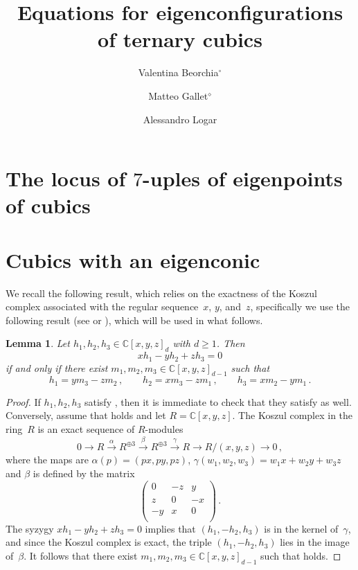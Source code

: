 \documentclass[a4paper, 11pt, reqno]{amsart}
\title{Equations for eigenconfigurations of ternary cubics}
\author[Valentina Beorchia]{Valentina Beorchia$^{\circ}$}
\author[Matteo Gallet]{Matteo Gallet$^{\diamond}$}
\author[Alessandro Logar]{Alessandro Logar}
\date{}
\theoremstyle{plain}
\newtheorem{lemma}{Lemma}[section]
\theoremstyle{definition}
\newcommand{\C}{\mathbb{C}}
\begin{document}
\maketitle


\section{The locus of $7$-uples of eigenpoints of cubics}

\section{Cubics with an eigenconic}




We recall the following result, which relies on the exactness of the Koszul complex associated with the regular sequence~$x$, $y$, and~$z$, specifically we use the following result (see \cite[Theorem~7.3.13]{Dolgachev} or \cite[Lemma~3.9]{BGV}), which will be used in what follows.

\begin{lemma}
\label{lem:Koszul}
Let $h_1,h_2,h_3\in\C[x,y,z]_d$ with $d \ge 1$. Then
%
\begin{equation}
\label{eq:linear_relazion}
  xh_1-yh_2+zh_3 = 0
\end{equation}
%
if and only if there exist $m_1,m_2,m_3\in\C[x,y,z]_{d-1}$ such that
%
\begin{equation}
\label{eq:minors_lemma}
  h_1 = ym_3-zm_2 \,, \qquad
  h_2 = xm_3-zm_1 \,, \qquad
  h_3 = xm_2-ym_1 \,.
\end{equation}
%
\end{lemma}

\begin{proof}
If $h_1,h_2,h_3$ satisfy , then it is immediate to check that they satisfy  as well. 
Conversely, assume that  holds and let $R = \C[x,y,z]$.
The Koszul complex in the ring~$R$ is an exact sequence of $R$-modules
%
\[
  0 \to R\xrightarrow{\alpha} R^{\oplus 3} \xrightarrow{\beta} R^{\oplus 3} \xrightarrow{\gamma} R \to R/(x,y,z) \to 0 \,,
\]
%
where the maps are $\alpha(p) = (p x, p y, p z)$, $\gamma (w_1,w_2,w_3) = w_1 x + w_2 y + w_3 z$ and $\beta$ is defined by the matrix
%
\[
  \left(
  \begin{array}{ccc}
    0 & -z & y\\
    z & 0 & -x\\
    -y & x & 0 \\
  \end{array}
  \right) \,.
\]
%
The syzygy $xh_1-yh_2+zh_3=0$ implies that $(h_1, -h_2, h_3)$ is in the kernel of~$\gamma$,
and since the Koszul complex is exact, the triple $(h_1,-h_2, h_3)$ lies in the image of~$\beta$.
It follows that there exist $m_1,m_2,m_3 \in \C[x,y,z]_{d-1}$ such that  holds.
\end{proof}
\end{document}
